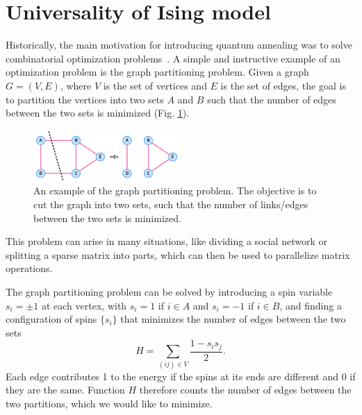 \documentclass[12pt,a4paper]{article}
\begin{document}
\section{Universality of Ising model} \label{sec:ising}
\hspace*{0.3cm}
Historically, the main motivation for introducing quantum annealing was to solve combinatorial optimization problems~\cite*{farhi2000quantum}.
A simple and instructive example of an optimization problem is the graph partitioning problem. Given a graph $G = (V, E)$, where $V$ is the set of vertices
and $E$ is the set of edges, the goal is to partition the vertices into two sets $A$ and $B$ such that the number of edges
between the two sets is minimized (Fig. \ref{fig:graph_partitioning}).
\begin{figure}[!htb]
    \centering
    \vspace*{-0.2cm}
    \includegraphics[width=0.5\textwidth]{../plots/min_cut.png}
    \captionsetup{width=0.9\textwidth}
    \caption{An example of the graph partitioning problem. The objective is to cut the graph into two sets,
    such that the number of links/edges between the two sets is minimized.}
    \label{fig:graph_partitioning}
\end{figure}
This problem can arise in many situations, like dividing a social network or
splitting a sparse matrix into parts, which can then be used to parallelize matrix operations. 

\hspace*{0.3cm}
The graph partitioning problem can be solved by introducing a spin variable $s_i = \pm 1$ at each vertex, with $s_i = 1$ if $i \in A$ and
$s_i = -1$ if $i \in B$, and finding a configuration of spins $\{s_i\}$
that minimizes the number of edges between the two sets
\begin{equation}
    H =  \sum_{(ij) \in V} \frac{1 - s_i s_j}{2}.
    \label{eq:graph_partitioning}
\end{equation}
Each edge contributes 1 to the energy if the spins at its ends are different and 0 if they are the same. Function
$H$ therefore counts the number of edges between the two partitions, which we would like to minimize.
\end{document}
